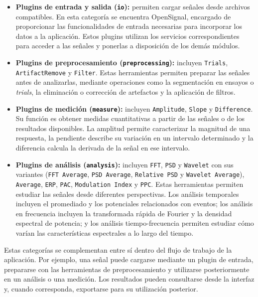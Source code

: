 \documentclass[11pt,a4paper]{article}
\DeclareRobustCommand{\_}{\textunderscore\allowbreak}
\begin{document}
\begin{itemize}
    \item \textbf{Plugins de entrada y salida (\texttt{io}):} permiten cargar señales desde archivos compatibles. En esta categoría se encuentra OpenSignal, encargado de proporcionar las funcionalidades de entrada necesarias para incorporar los datos a la aplicación. Estos plugins utilizan los servicios correspondientes para acceder a las señales y ponerlas a disposición de los demás módulos.

    \item \textbf{Plugins de preprocesamiento (\texttt{preprocessing}):} incluyen \texttt{Trials}, \texttt{ArtifactRemove} y \texttt{Filter}. Estas herramientas permiten preparar las señales antes de analizarlas, mediante operaciones como la segmentación en ensayos o \textit{trials}, la eliminación o corrección de artefactos y la aplicación de filtros.

    \item \textbf{Plugins de medición (\texttt{measure}):} incluyen \texttt{Amplitude}, \texttt{Slope} y \texttt{Difference}. Su función es obtener medidas cuantitativas a partir de las señales o de los resultados disponibles. La amplitud permite caracterizar la magnitud de una respuesta, la pendiente describe su variación en un intervalo determinado y la diferencia calcula la derivada de la señal en ese intervalo.

    \item \textbf{Plugins de análisis (\texttt{analysis}):} incluyen \texttt{FFT}, \texttt{PSD} y \texttt{Wavelet} con sus variantes (\texttt{FFT Average}, \texttt{PSD Average}, \texttt{Relative PSD} y \texttt{Wavelet Average}), \texttt{Average}, \texttt{ERP}, \texttt{PAC}, \texttt{Modulation Index} y \texttt{PPC}. Estas herramientas permiten estudiar las señales desde diferentes perspectivas. Los análisis temporales incluyen el promediado y los potenciales relacionados con eventos; los análisis en frecuencia incluyen la transformada rápida de Fourier y la densidad espectral de potencia; y los análisis tiempo-frecuencia permiten estudiar cómo varían las características espectrales a lo largo del tiempo.
\end{itemize}

Estas categorías se complementan entre sí dentro del flujo de trabajo de la aplicación. Por ejemplo, una señal puede cargarse mediante un plugin de entrada, prepararse con las herramientas de preprocesamiento y utilizarse posteriormente en un análisis o una medición. Los resultados pueden consultarse desde la interfaz y, cuando corresponda, exportarse para su utilización posterior.
\end{document}
